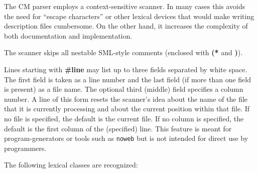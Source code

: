 \documentclass[titlepage,letterpaper]{article}
\begin{document}
The CM parser employs a context-sensitive scanner.  In many cases this
avoids the need for ``escape characters'' or other lexical devices
that would make writing description files cumbersome.  On the other
hand, it increases the complexity of both documentation and implementation.

The scanner skips all nestable SML-style comments (enclosed with {\bf
(*} and {\bf *)}).

Lines starting with {\bf \#line} may list up to three fields separated
by white space.  The first field is taken as a line number and the
last field (if more than one field is present) as a file name.  The
optional third (middle) field specifies a column number.  A line of
this form resets the scanner's idea about the name of the file that it
is currently processing and about the current position within that
file.  If no file is specified, the default is the current file.  If
no column is specified, the default is the first column of the
(specified) line.  This feature is meant for program-generators or
tools such as {\tt noweb} but is not intended for direct use by
programmers.

The following lexical classes are recognized:
\end{document}
